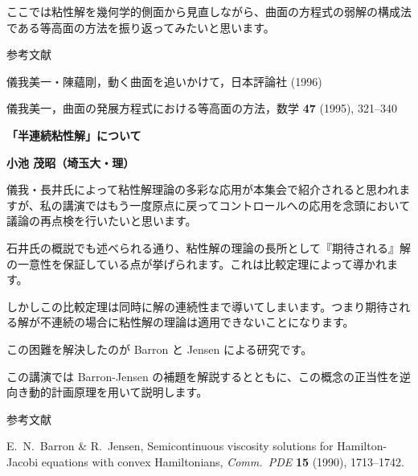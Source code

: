 \documentclass[uplatex,dvipdfmx]{jlreq}
\begin{document}
ここでは粘性解を幾何学的側面から見直しながら、曲面の方程式の弱解の構成法である等高面の方法を振り返ってみたいと思います。

\bigskip

\begin{center}\textsc{参考文献}\end{center}

\begin{enumerate}[{[1]}]
  \item 儀我美一・陳蘊剛，動く曲面を追いかけて，日本評論社 (1996)
  \item 儀我美一，曲面の発展方程式における等高面の方法，数学 \textbf{47} (1995), 321--340
\end{enumerate}

\newpage

\begin{center}
{\large\bfseries 「半連続粘性解」について}
\end{center}

\begin{flushright}
\textbf{小池 茂昭（埼玉大・理）}
\end{flushright}

儀我・長井氏によって粘性解理論の多彩な応用が本集会で紹介されると思われますが、私の講演ではもう一度原点に戻ってコントロールへの応用を念頭において議論の再点検を行いたいと思います。

石井氏の概説でも述べられる通り、粘性解の理論の長所として『期待される』解の一意性を保証している点が挙げられます。これは比較定理によって導かれます。

しかしこの比較定理は同時に解の連続性まで導いてしまいます。つまり期待される解が不連続の場合に粘性解の理論は適用できないことになります。

この困難を解決したのが Barron と Jensen による研究です。

この講演では Barron-Jensen の補題を解説するとともに、この概念の正当性を逆向き動的計画原理を用いて説明します。

\bigskip

\begin{center}\textsc{参考文献}\end{center}

\begin{enumerate}[{[1]}]
  \item E.~N.~Barron \& R.~Jensen,
        Semicontinuous viscosity solutions for Hamilton-Jacobi equations with convex Hamiltonians,
        \textit{Comm.\ PDE} \textbf{15} (1990), 1713--1742.
\end{enumerate}
\end{document}
